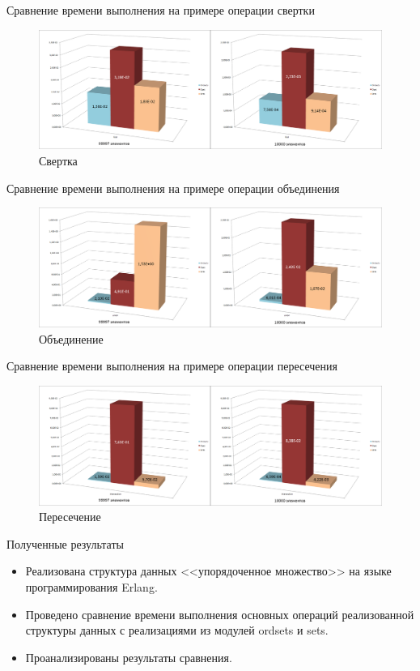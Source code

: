 \documentclass{beamer}
\begin{document}
	
	\begin{frame}{Сравнение времени выполнения на примере операции свертки}
		\begin{figure}
			\includegraphics[scale=0.18]{img/histograms/fold.png}
			\caption{Свертка}
		\end{figure}
	\end{frame}
	
	
	\begin{frame}{Сравнение времени выполнения на примере операции объединения}
		\begin{figure}
			\includegraphics[scale=0.18]{img/histograms/union.png}
			\caption{Объединение}
		\end{figure}
	\end{frame}
	
	\begin{frame}{Сравнение времени выполнения на примере операции пересечения}
		\begin{figure}
			\includegraphics[scale=0.18]{img/histograms/intersection.png}
			\caption{Пересечение}
		\end{figure}		
	\end{frame}
	
	\begin{frame}{Полученные результаты}
		\begin{itemize}
			\item Реализована структура данных <<упорядоченное множество>> на языке программирования Erlang.
			\item Проведено сравнение времени выполнения основных операций реализованной структуры данных с 
			      реализациями из модулей ordsets и sets. 
			\item Проанализированы результаты сравнения.
		\end{itemize}
	\end{frame}
\end{document}
